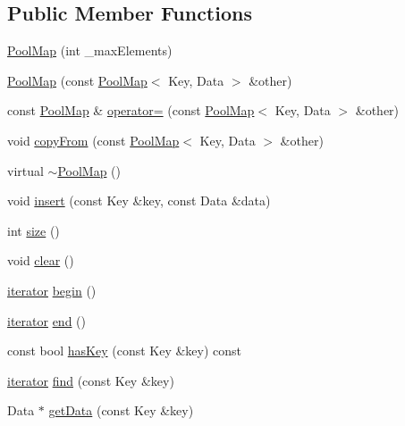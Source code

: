 \subsection*{Public Member Functions}
\begin{CompactItemize}
\item 
\hyperlink{class_j_g_t_l_1_1_pool_map_8f488dfbc3383bc75157b60640b33ade}{Pool\-Map} (int \_\-max\-Elements)
\item 
\hyperlink{class_j_g_t_l_1_1_pool_map_a276af8c63cb02ed4d2de28bf36cd7cc}{Pool\-Map} (const \hyperlink{class_j_g_t_l_1_1_pool_map}{Pool\-Map}$<$ Key, Data $>$ \&other)
\item 
const \hyperlink{class_j_g_t_l_1_1_pool_map}{Pool\-Map} \& \hyperlink{class_j_g_t_l_1_1_pool_map_205541080219447b7651aadd391816e4}{operator=} (const \hyperlink{class_j_g_t_l_1_1_pool_map}{Pool\-Map}$<$ Key, Data $>$ \&other)
\item 
void \hyperlink{class_j_g_t_l_1_1_pool_map_3b3148e41d7f1df718801cd7396fd89f}{copy\-From} (const \hyperlink{class_j_g_t_l_1_1_pool_map}{Pool\-Map}$<$ Key, Data $>$ \&other)
\item 
virtual \hyperlink{class_j_g_t_l_1_1_pool_map_3b37f6bc0c5a42b4354edbd8ce8b907b}{$\sim$Pool\-Map} ()
\item 
void \hyperlink{class_j_g_t_l_1_1_pool_map_669bf1d78e81cdd09fb6d2b1aea4ce9a}{insert} (const Key \&key, const Data \&data)
\item 
int \hyperlink{class_j_g_t_l_1_1_pool_map_d9936165993f004d6c8b8aca4614e522}{size} ()
\item 
void \hyperlink{class_j_g_t_l_1_1_pool_map_e89e7a5f21139dd6dd927d1898bb9f7c}{clear} ()
\item 
\hyperlink{class_j_g_t_l_1_1_pool_map_b3af40821696ebcf9f62a3e9d91324ee}{iterator} \hyperlink{class_j_g_t_l_1_1_pool_map_2a375fae39774d1abe87588cffc9411a}{begin} ()
\item 
\hyperlink{class_j_g_t_l_1_1_pool_map_b3af40821696ebcf9f62a3e9d91324ee}{iterator} \hyperlink{class_j_g_t_l_1_1_pool_map_8d356ec14bedcd97fc2428ee7c7ba75b}{end} ()
\item 
const bool \hyperlink{class_j_g_t_l_1_1_pool_map_ed7f7adf472a3cb6be038adafcd1db70}{has\-Key} (const Key \&key) const 
\item 
\hyperlink{class_j_g_t_l_1_1_pool_map_b3af40821696ebcf9f62a3e9d91324ee}{iterator} \hyperlink{class_j_g_t_l_1_1_pool_map_bbf48a295265f59eb595e7695997ac14}{find} (const Key \&key)
\item 
Data $\ast$ \hyperlink{class_j_g_t_l_1_1_pool_map_097cdf2c2bae8f59db2849a7b62f82d0}{get\-Data} (const Key \&key)

\end{CompactItemize}
